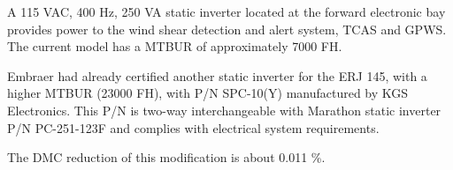 A 115 VAC, 400 Hz, 250 VA static inverter located at the forward electronic bay provides power to the wind shear detection and alert system, TCAS and GPWS. The current model has a MTBUR of approximately 7000 FH.

Embraer had already certified another static inverter for the ERJ 145, with a higher MTBUR (23000 FH), with P/N SPC-10(Y) manufactured by KGS Electronics. This P/N is two-way interchangeable with Marathon static inverter P/N PC-251-123F and complies with electrical system requirements.

The DMC reduction of this modification is about 0.011 \%.
